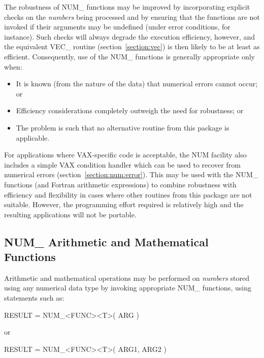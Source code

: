 \documentclass[11pt,nolof]{starlink}
\providecommand{\name}[1]{\mbox{#1}}
\begin{document}
The robustness of \name{NUM\_} functions may be improved by incorporating
explicit checks on the \emph{numbers} being processed and by ensuring that
the functions are not invoked if their arguments may be undefined (under
error conditions, for instance).
Such checks will always degrade the execution efficiency, however, and the
equivalent \name{VEC\_} routine (section~\ref{section:vec}) is then likely
to be at least as efficient.
Consequently, use of the \name{NUM\_} functions is generally appropriate
only when:

\begin{itemize}

\item It is known (from the nature of the data) that numerical errors cannot
occur; or

\item Efficiency considerations completely outweigh the need for robustness;
or

\item The problem is such that no alternative routine from this package
is applicable.

\end{itemize}

For applications where \name{VAX}-specific code is acceptable, the
\name{NUM} facility also includes a simple \name{VAX} condition handler
which can be used to recover from numerical errors
(section~\ref{section:num:error}).
This may be used with the \name{NUM\_} functions (and Fortran arithmetic
expressions) to combine robustness with efficiency and flexibility in cases
where other routines from this package are not suitable.
However, the programming effort required is relatively high and the
resulting applications will not be portable.

\subsection{\name{NUM\_} Arithmetic and Mathematical Functions}

Arithmetic and mathematical operations may be performed on \emph{numbers}
stored using any numerical data type by invoking appropriate \name{NUM\_}
functions, using statements such as:

\begin{terminalv}
RESULT = NUM_<FUNC><T>( ARG )
\end{terminalv}
or
\begin{terminalv}
RESULT = NUM_<FUNC><T>( ARG1, ARG2 )
\end{terminalv}
\end{document}
